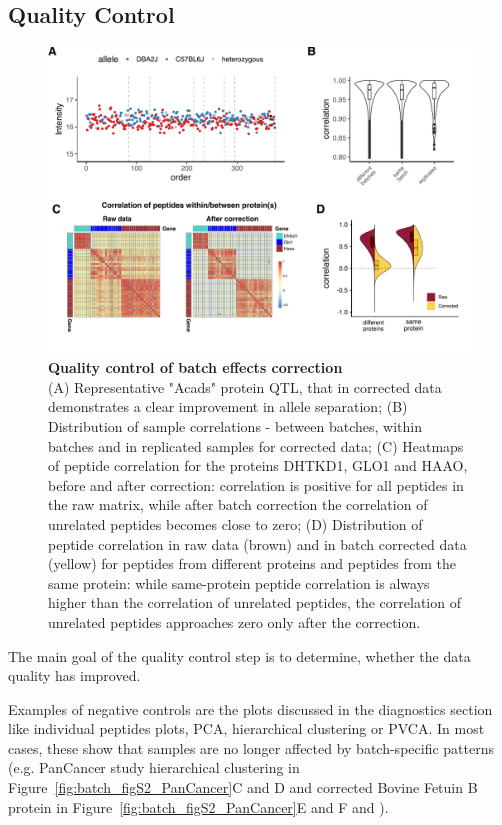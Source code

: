 \documentclass[num-refs]{wiley-article}
\begin{document}
\subsection{Quality Control}
\begin{figure}[hbt]
	\includegraphics[width=\textwidth]{figures/Fig6_quality_control2.pdf}
	
	\caption{\textbf{Quality control of batch effects correction}  \\
		\footnotesize
		(A) Representative "Acads" protein QTL, that in corrected data demonstrates a clear improvement in allele separation; (B) Distribution of sample correlations - between batches, within batches and in replicated samples for corrected data; (C)  Heatmaps of peptide correlation for the proteins DHTKD1, GLO1 and HAAO, before and after correction: correlation is positive for all peptides in the raw matrix, while after batch correction the correlation of unrelated peptides becomes close to zero; (D) Distribution of peptide correlation in raw data (brown) and in batch corrected data (yellow) for peptides from different proteins and peptides from the same protein: while same-protein peptide correlation is always higher than the correlation of unrelated peptides, the correlation of unrelated peptides approaches zero only after the correction.}
	\label{fig:batch_fig6_QualityControl}
\end{figure}


The main goal of the quality control step is to determine, whether the data quality has improved. 

Examples of negative controls are the plots discussed in the diagnostics section like individual peptides plots, PCA, hierarchical clustering or PVCA. In most cases, these show that samples are no longer affected by batch-specific patterns (e.g. PanCancer study hierarchical clustering in Figure~\ref{fig:batch_figS2_PanCancer}C and D and corrected Bovine Fetuin B protein in Figure~\ref{fig:batch_figS2_PanCancer}E and F and ).
\end{document}
